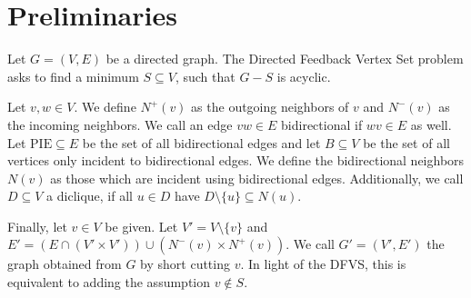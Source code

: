 
\section{Preliminaries}\label{sec:prelims}

Let $G = (V,E)$ be a directed graph.
The Directed Feedback Vertex Set problem asks to find a minimum $S\subseteq V$, such that $G - S$ is acyclic.

Let $v,w  \in V$.
We define $N^+(v)$ as the outgoing neighbors of $v$ and $N^-(v)$ as the incoming neighbors.
We call an edge $vw \in E$ bidirectional if $wv \in E$ as well.
Let $\text{PIE}\subseteq E$ be the set of all bidirectional edges and let $B\subseteq V$ be the set of all vertices only incident to bidirectional edges.
We define the bidirectional neighbors $N(v)$ as those which are incident using bidirectional edges.
Additionally, we call $D\subseteq V$ a diclique, if all $u \in D$ have $D \setminus \{u\} \subseteq N(u)$.

Finally, let $v\in V$ be given.
Let $V' = V \setminus \{v\}$ and $E' = (E \cap (V' \times V')) \cup (N^-(v) \times N^+(v))$.
We call  $G'= (V', E')$ the graph obtained from $G$ by short cutting $v$.
In light of the DFVS, this is equivalent to adding the assumption $v \notin S$.